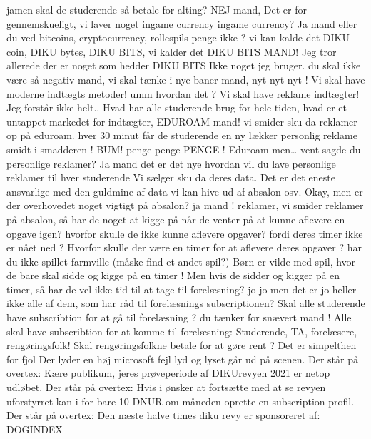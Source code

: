 \documentclass[a4paper,11pt]{article}
\begin{document}
\begin{sketch}
 jamen skal de studerende så betale for alting? 
  NEJ mand, Det er for gennemskueligt, vi laver noget ingame currency
 ingame currency?
 Ja mand eller du ved bitcoins, cryptocurrency, rollespils penge ikke ? vi kan kalde det DIKU coin, DIKU bytes, DIKU BITS, vi kalder det DIKU BITS MAND!
 Jeg tror allerede der er noget som hedder DIKU BITS
 Ikke noget jeg bruger. du skal ikke være så negativ mand, vi skal tænke i nye baner mand, nyt nyt nyt ! Vi skal have moderne indtægts metoder! 
 umm hvordan det ? 
Vi skal have reklame indtægter!
 Jeg forstår ikke helt..
 Hvad har alle studerende brug for hele tiden, hvad er et untappet markedet for indtægter, EDUROAM mand! vi smider sku da reklamer op på eduroam. hver 30 minut får de studerende en ny lækker personlig reklame smidt i smadderen ! BUM! penge penge PENGE !
 Eduroam men… vent sagde du personlige reklamer? 
 Ja mand det er det nye 
 hvordan vil du lave personlige reklamer til hver studerende
 Vi sælger sku da deres data. Det er det eneste ansvarlige med den guldmine af data vi kan hive ud af absalon osv.
 Okay, men er der overhovedet noget vigtigt på absalon? 
 ja mand ! reklamer, vi smider reklamer på absalon, så har de noget at kigge på når de venter på at kunne aflevere en opgave igen?
 hvorfor skulle de ikke kunne aflevere opgaver?
 fordi deres timer ikke er nået ned ?
 Hvorfor skulle der være en timer for at aflevere deres opgaver ?
 har du ikke spillet farmville (måske find et andet spil?) Børn er vilde med spil, hvor de bare skal sidde og kigge på en timer ! 
 Men hvis de sidder og kigger på en timer, så har de vel ikke tid til at tage til forelæsning?
 jo jo men det er jo heller ikke alle af dem, som har råd til forelæsnings subscriptionen?
 Skal alle studerende have subscribtion for at gå til forelæsning ? 
 du tænker for snævert mand ! Alle skal have subscribtion for at komme til forelæsning: Studerende, TA, forelæsere, rengøringsfolk!
 Skal rengøringsfolkne betale for at gøre rent ? Det er simpelthen for fjol
Der lyder en høj microsoft fejl lyd og lyset går ud på scenen.
Der står på overtex: Kære publikum, jeres prøveperiode af DIKUrevyen 2021 er netop udløbet.
Der står på overtex: Hvis i ønsker at fortsætte med at se revyen uforstyrret kan i for bare 10 DNUR  om måneden oprette en subscription profil.
Der står på overtex: Den næste halve times diku revy er sponsoreret af: DOGINDEX

\end{sketch}
\end{document}
